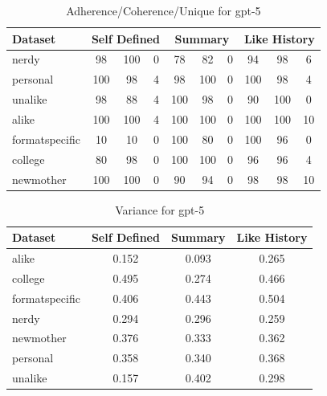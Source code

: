\documentclass[11pt]{article}
\begin{document}
\begin{table}[H]
\centering
\caption{Adherence/Coherence/Unique for gpt-5}
\begin{tabular}{|l|ccc|ccc|ccc|}
\hline
\textbf{Dataset} & \multicolumn{3}{c|}{\textbf{Self Defined}} & \multicolumn{3}{c|}{\textbf{Summary}} & \multicolumn{3}{c|}{\textbf{Like History}} \\
\hline
nerdy & 98 & 100 & 0 & 78 & 82 & 0 & 94 & 98 & 6 \\
\hline
personal & 100 & 98 & 4 & 98 & 100 & 0 & 100 & 98 & 4 \\
\hline
unalike & 98 & 88 & 4 & 100 & 98 & 0 & 90 & 100 & 0 \\
\hline
alike & 100 & 100 & 4 & 100 & 100 & 0 & 100 & 100 & 10 \\
\hline
formatspecific & 10 & 10 & 0 & 100 & 80 & 0 & 100 & 96 & 0 \\
\hline
college & 80 & 98 & 0 & 100 & 100 & 0 & 96 & 96 & 4 \\
\hline
newmother & 100 & 100 & 0 & 90 & 94 & 0 & 98 & 98 & 10 \\
\hline
\end{tabular}
\end{table}

\begin{table}[H]
\centering
\caption{Variance for gpt-5}
\begin{tabular}{|l|c|c|c|}
\hline
\textbf{Dataset} & \textbf{Self Defined} & \textbf{Summary} & \textbf{Like History} \\
\hline
alike & 0.152 & 0.093 & 0.265 \\
\hline
college & 0.495 & 0.274 & 0.466 \\
\hline
formatspecific & 0.406 & 0.443 & 0.504 \\
\hline
nerdy & 0.294 & 0.296 & 0.259 \\
\hline
newmother & 0.376 & 0.333 & 0.362 \\
\hline
personal & 0.358 & 0.340 & 0.368 \\
\hline
unalike & 0.157 & 0.402 & 0.298 \\
\hline
\end{tabular}
\end{table}
\end{document}

